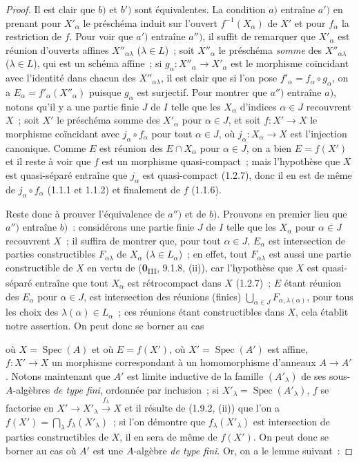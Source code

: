 \begin{proof}
Il est clair que $b)$ et $b')$ sont équivalentes. La condition $a)$ entraîne
$a')$ en prenant pour $X'_\alpha$ le préschéma induit sur l'ouvert
$f^{-1}(X_\alpha)$ de $X'$ et pour $f_\alpha$ la restriction de $f$. Pour
voir que $a')$ entraîne $a'')$, il suffit de remarquer que $X'_\alpha$ est
réunion d'ouverts affines $X''_{\alpha\lambda}$ ($\lambda\in L$)~; soit
$X''_\alpha$ le préschéma \emph{somme} des $X''_{\alpha\lambda}$
($\lambda\in L$), qui est un schéma affine~; si
$g_\alpha:X''_\alpha\to X'_\alpha$ est le morphisme coïncidant avec
l'identité dans chacun des $X''_{\alpha\lambda}$, il est clair que si l'on
pose $f'_\alpha=f_\alpha\circ g_\alpha$, on a
$E_\alpha=f'_\alpha(X''_\alpha)$ puisque $g_\alpha$ est surjectif. Pour
montrer que $a'')$ entraîne $a)$, notons qu'il y a une partie finie $J$ de
$I$ telle que les $X_\alpha$ d'indices $\alpha\in J$ recouvrent $X$~; soit
$X'$ le préschéma somme des $X'_\alpha$ pour $\alpha\in J$, et soit
$f:X'\to X$ le morphisme coïncidant avec $j_\alpha\circ f_\alpha$ pour tout
$\alpha\in J$, où $j_\alpha:X_\alpha\to X$ est l'injection canonique. Comme
$E$ est réunion des $E\cap X_\alpha$ pour $\alpha\in J$, on a bien
$E=f(X')$ et il reste à voir que $f$ est un morphisme quasi-compact~; mais
l'hypothèse que $X$ est quasi-séparé entraîne que $j_\alpha$ est
quasi-compact (1.2.7), donc il en est de même de
$j_\alpha\circ f_\alpha$ (1.1.1 et 1.1.2) et finalement de $f$ (1.1.6).

Reste donc à prouver l'équivalence de $a'')$ et de $b)$. Prouvons en premier
lieu que $a'')$ entraîne $b)$~: considérons une partie finie $J$ de $I$ telle
que les $X_\alpha$ pour $\alpha\in J$ recouvrent $X$~; il suffira de montrer
que, pour tout $\alpha\in J$, $E_\alpha$ est intersection de parties
constructibles $F_{\alpha\lambda}$ de $X_\alpha$ ($\lambda\in L_\alpha$)~;
en effet, tout $F_{\alpha\lambda}$ est aussi une partie constructible de $X$
en vertu de (\textbf{0}\textsubscript{III}, 9.1.8, (ii)), car l'hypothèse que $X$ est
quasi-séparé entraîne que tout $X_\alpha$ est rétrocompact dans $X$ (1.2.7)~;
$E$ étant réunion des $E_\alpha$ pour $\alpha\in J$, est intersection des
réunions (finies) $\bigcup_{\alpha\in J}F_{\alpha,\lambda(\alpha)}$, pour
tous les choix des $\lambda(\alpha)\in L_\alpha$~; ces réunions étant
constructibles dans $X$, cela établit notre assertion. On peut donc se borner
au cas


où $X=\operatorname{Spec}(A)$ et où $E=f(X')$, où
$X'=\operatorname{Spec}(A')$ est affine, $f:X'\to X$ un morphisme
correspondant à un homomorphisme d'anneaux $A\to A'$. Notons maintenant que
$A'$ est limite inductive de la famille $(A'_\lambda)$ de ses
sous-$A$-algèbres \emph{de type fini}, ordonnée par inclusion~; si
$X'_\lambda=\operatorname{Spec}(A'_\lambda)$, $f$ se factorise en
$X'\to X'_\lambda\xrightarrow{f_\lambda}X$ et il résulte de (1.9.2, (ii))
que l'on a $f(X')=\bigcap_\lambda f_\lambda(X'_\lambda)$~; si l'on démontre
que $f_\lambda(X'_\lambda)$ est intersection de parties constructibles de
$X$, il en sera de même de $f(X')$. On peut donc se borner au cas où $A'$ est
une $A$-algèbre \emph{de type fini}. Or, on a le lemme suivant~:
\end{proof}
